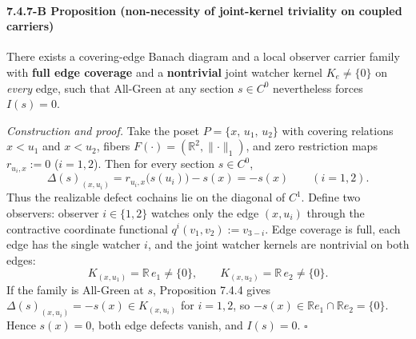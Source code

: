 \documentclass[
  11pt,
]{article}
\begin{document}
\paragraph{7.4.7-B Proposition (non-necessity of joint-kernel triviality on coupled carriers)}\label{b-proposition-non-necessity-of-joint-kernel-triviality-on-coupled-carriers}

There exists a covering-edge Banach diagram and a local observer carrier family with \textbf{full edge coverage} and a \textbf{nontrivial} joint watcher kernel \(K_e\neq\{0\}\) on \emph{every} edge, such that All-Green at any section \(s\in C^0\) nevertheless forces \(I(s)=0\).

\emph{Construction and proof.} Take the poset \(P=\{x,\,u_1,\,u_2\}\) with covering relations \(x<u_1\) and \(x<u_2\), fibers \(F(\cdot)=(\mathbb R^2,\lVert\cdot\rVert_1)\), and zero restriction maps \(r_{u_i,x}:=0\) (\(i=1,2\)). Then for every section \(s\in C^0\),
\[
\Delta(s)_{(x,u_i)} = r_{u_i,x}\bigl(s(u_i)\bigr)-s(x) = -s(x)
\qquad(i=1,2).
\]
Thus the realizable defect cochains lie on the diagonal of \(C^1\). Define two observers: observer \(i\in\{1,2\}\) watches only the edge \((x,u_i)\) through the contractive coordinate functional \(q^i(v_1,v_2):=v_{3-i}\). Edge coverage is full, each edge has the single watcher \(i\), and the joint watcher kernels are nontrivial on both edges:
\[
K_{(x,u_1)}=\mathbb R\,e_1\neq\{0\},
\qquad
K_{(x,u_2)}=\mathbb R\,e_2\neq\{0\}.
\]
If the family is All-Green at \(s\), Proposition 7.4.4 gives \(\Delta(s)_{(x,u_i)}=-s(x)\in K_{(x,u_i)}\) for \(i=1,2\), so \(-s(x)\in\mathbb R e_1\cap\mathbb R e_2=\{0\}\). Hence \(s(x)=0\), both edge defects vanish, and \(I(s)=0\). \(\square\)
\end{document}

